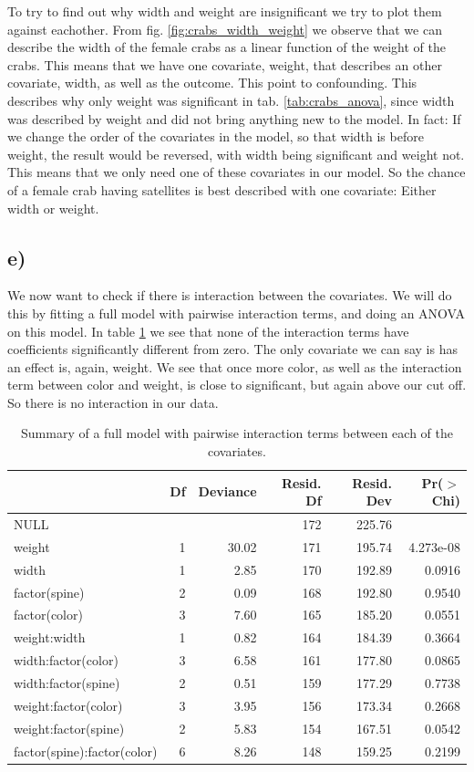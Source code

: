 \documentclass[a4paper,norsk, 10pt]{article}
\begin{document}
To try to find out why width and weight are insignificant we try to plot them against eachother. From fig. \ref{fig:crabs_width_weight} we observe that we can describe the width of the female crabs as a linear function of the weight of the crabs. This means that we have one covariate, weight, that describes an other covariate, width, as well as the outcome. This point to confounding. This describes why only weight was significant in tab. \ref{tab:crabs_anova}, since width was described by weight and did not bring anything new to the model. In fact: If we change the order of the covariates in the model, so that width is before weight, the result would be reversed, with width being significant and weight not. This means that we only need one of these covariates in our model. So the chance of a female crab having satellites is best described with one covariate: Either width or weight.

\subsection{e)}
We now want to check if there is interaction between the covariates. We will do this by fitting a full model with pairwise interaction terms, and doing an ANOVA on this model. In table \ref{tab:crabs_interaction} we see that none of the interaction terms have coefficients significantly different from zero. The only covariate we can say is has an effect is, again, weight. We see that once more color, as well as the interaction term between color and weight, is close to significant, but again above our cut off. So there is no interaction in our data. 	

\begin{table}[ht]
\centering
\begin{tabular}{lrrrrr}
  \hline
 & Df & Deviance & Resid. Df & Resid. Dev & Pr($>$Chi) \\ 
  \hline
NULL &  &  & 172 & 225.76 &  \\ 
  weight & 1 & 30.02 & 171 & 195.74 & 4.273e-08 \\ 
  width & 1 & 2.85 & 170 & 192.89 & 0.0916 \\ 
  factor(spine) & 2 & 0.09 & 168 & 192.80 & 0.9540 \\ 
  factor(color) & 3 & 7.60 & 165 & 185.20 & 0.0551 \\ 
  weight:width & 1 & 0.82 & 164 & 184.39 & 0.3664 \\ 
  width:factor(color) & 3 & 6.58 & 161 & 177.80 & 0.0865 \\ 
  width:factor(spine) & 2 & 0.51 & 159 & 177.29 & 0.7738 \\ 
  weight:factor(color) & 3 & 3.95 & 156 & 173.34 & 0.2668 \\ 
  weight:factor(spine) & 2 & 5.83 & 154 & 167.51 & 0.0542 \\ 
  factor(spine):factor(color) & 6 & 8.26 & 148 & 159.25 & 0.2199 \\ 
   \hline
\end{tabular}
\caption{Summary of a full model with pairwise interaction terms between each of the covariates.}\label{tab:crabs_interaction}
\end{table}
\end{document}
